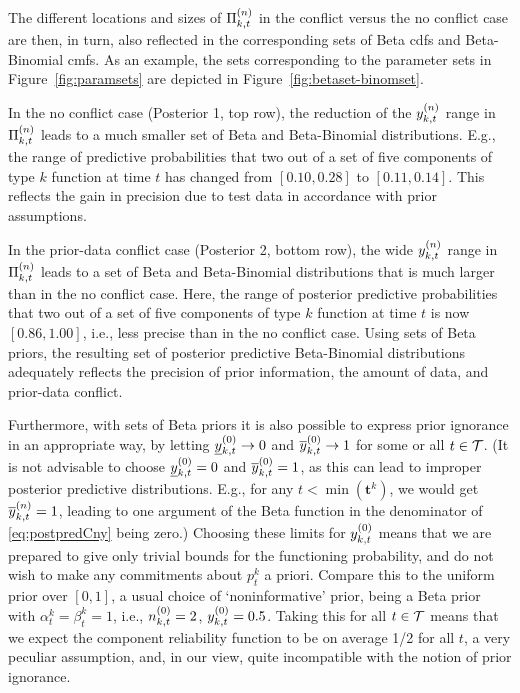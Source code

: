 \documentclass[12pt, a4paper]{elsarticle}
\newcommand{\bs}[1]{\boldsymbol{#1}}
\renewcommand{\vec}[1]{{\bs#1}}
\begin{document}
The different locations and sizes of $\Pi^{(n)}_{k,t}$ in the conflict versus the no conflict case are then, in turn,
also reflected in the corresponding sets of Beta cdfs and Beta-Binomial cmfs.
As an example, the sets corresponding to the parameter sets in Figure~\ref{fig:paramsets}
are depicted in Figure~\ref{fig:betaset-binomset}.

In the no conflict case (Posterior 1, top row),
the reduction of the $y^{(n)}_{k,t}$ range in $\Pi^{(n)}_{k,t}$ leads to a much smaller set
of Beta and Beta-Binomial distributions.
E.g., the range of predictive probabilities
that two out of a set of five components of type $k$ function at time $t$ 
has changed from $[0.10, 0.28]$ to $[0.11,0.14]$.
This reflects the gain in precision due to test data in accordance with prior assumptions.

In the prior-data conflict case (Posterior 2, bottom row),
the wide $y^{(n)}_{k,t}$ range in $\Pi^{(n)}_{k,t}$ leads to a set of Beta and Beta-Binomial distributions
that is much larger than in the no conflict case.
Here, the range of posterior predictive probabilities
that two out of a set of five components of type $k$ function at time $t$
is now $[0.86, 1.00]$, i.e., less precise than in the no conflict case.
Using sets of Beta priors, the resulting set of posterior predictive Beta-Binomial distributions
adequately reflects the precision of prior information,
the amount of data, and prior-data conflict.

Furthermore, with sets of Beta priors it is also possible
to express prior ignorance in an appropriate way,
by letting $\underline{y}^{(0)}_{k,t} \to 0$ and $\overline{y}^{(0)}_{k,t} \to 1$
for some or all $t \in {\cal T}$.
(It is not advisable to choose $\underline{y}^{(0)}_{k,t} = 0$ and $\overline{y}^{(0)}_{k,t} = 1$,
as this can lead to improper posterior predictive distributions.
E.g., for any $t < \min(\vec{t}^k)$,
we would get $\overline{y}^{(n)}_{k,t} = 1$, leading to one argument of the Beta function
in the denominator of \eqref{eq:postpredCny} being zero.)
Choosing these limits for $y^{(0)}_{k,t}$ means that we are prepared to give only trivial bounds for the functioning probability,
and do not wish to make any commitments about $p^k_t$ a priori.
Compare this to the uniform prior over $[0,1]$, a usual choice of `noninformative' prior,
being a Beta prior with $\alpha^k_t = \beta^k_t = 1$, i.e., $n^{(0)}_{k,t} = 2$, $y^{(0)}_{k,t} = 0.5$.
Taking this for all $t \in {\cal T}$ means that we expect the component reliability function
to be on average 1/2 for all $t$, a very peculiar assumption,
and, in our view, quite incompatible with the notion of prior ignorance.
\end{document}
